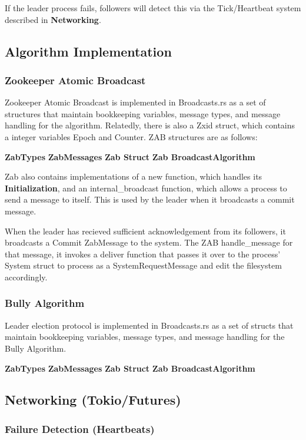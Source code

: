 \documentclass{article}
\begin{document}
		If the leader process fails, followers will detect this via the Tick/Heartbeat system described in \textbf{Networking}.



\subsection*{Algorithm Implementation}
	\subsubsection*{Zookeeper Atomic Broadcast}
	Zookeeper Atomic Broadcast is implemented in Broadcasts.rs as a set of structures that maintain bookkeeping variables, message types, and message handling for the algorithm. Relatedly, there is also a Zxid struct, which contains a integer variables Epoch and Counter. ZAB structures are as follows: 

	\t\textbf{ZabTypes}
	\t\textbf{ZabMessages}
	\t\textbf{Zab Struct}
	\t\textbf{Zab BroadcastAlgorithm}
	
	Zab also contains implementations of a new function, which handles its \textbf{Initialization}, and an internal_broadcast function, which allows a process to send a message to itself. This is used by the leader when it broadcasts a commit message. 

	When the leader has recieved sufficient acknowledgement from its followers, it broadcasts a Commit ZabMessage to the system. The ZAB handle_message for that message, it invokes a deliver function that passes it over to the process' System struct to process as a SystemRequestMessage and edit the filesystem accordingly. 


	\subsubsection*{Bully Algorithm}
	Leader election protocol is implemented in Broadcasts.rs as a set of structs that maintain bookkeeping variables, message types, and message handling for the Bully Algorithm. 

	\t\textbf{ZabTypes}
	\t\textbf{ZabMessages}
	\t\textbf{Zab Struct}
	\t\textbf{Zab BroadcastAlgorithm}


\subsection*{Networking (Tokio/Futures)}
\subsubsection*{Failure Detection (Heartbeats)}
\end{document}
